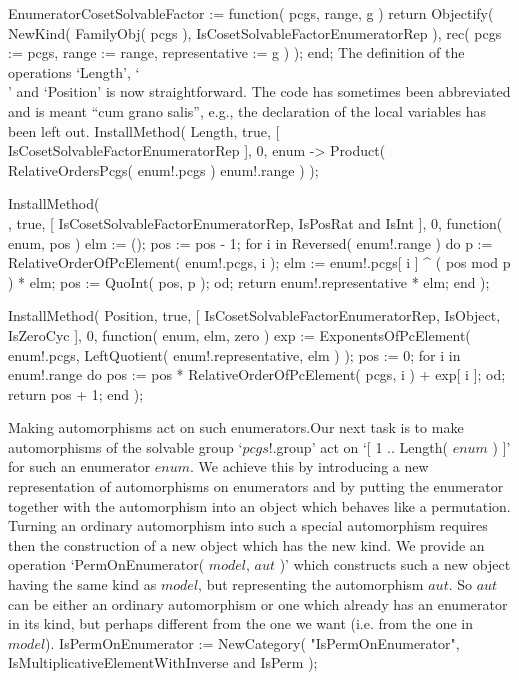 EnumeratorCosetSolvableFactor := function( pcgs, range, g )
    return Objectify( NewKind( FamilyObj( pcgs ),
                   IsCosetSolvableFactorEnumeratorRep ),
                   rec( pcgs := pcgs,
                       range := range,
              representative := g ) );
end;
\endtt
The definition of the operations `Length', `\\[\\]' and `Position' is now
straightforward. The  code has sometimes  been  abbreviated and is  meant
``cum grano salis'',  e.g.,  the declaration of  the local  variables has
been left out.
\begintt
InstallMethod( Length, true, [ IsCosetSolvableFactorEnumeratorRep ], 0,
    enum -> Product( RelativeOrdersPcgs( enum!.pcgs ){ enum!.range } ) );
\endtt

\begintt
InstallMethod( \[\], true, [ IsCosetSolvableFactorEnumeratorRep,
        IsPosRat and IsInt ], 0,
    function( enum, pos )
    elm := ();
    pos := pos - 1;
    for i  in Reversed( enum!.range )  do
        p := RelativeOrderOfPcElement( enum!.pcgs, i );
        elm := enum!.pcgs[ i ] ^ ( pos mod p ) * elm;
        pos := QuoInt( pos, p );
    od;
    return enum!.representative * elm;
end );
\endtt

\begintt
InstallMethod( Position, true, [ IsCosetSolvableFactorEnumeratorRep,
        IsObject, IsZeroCyc ], 0,
    function( enum, elm, zero )
    exp := ExponentsOfPcElement( enum!.pcgs,
                   LeftQuotient( enum!.representative, elm ) );
    pos := 0;
    for i  in enum!.range  do
        pos := pos * RelativeOrderOfPcElement( pcgs, i ) + exp[ i ];
    od;
    return pos + 1;
end );
\endtt

{\bsf  Making automorphisms act  on such enumerators.}\quad Our next task
is to make automorphisms of the  solvable group `$pcgs$!.group' act on `[
1 .. Length( $enum$ )  ]' for such an  enumerator $enum$. We achieve this
by  introducing a new  representation of automorphisms on enumerators and
by putting the enumerator together  with the automorphism into an  object
which behaves like  a permutation. Turning  an ordinary automorphism into
such  a special  automorphism requires  then   the construction of  a new
object which has the new kind. We provide an operation `PermOnEnumerator(
$model$, $aut$ )' which constructs such a new object having the same kind
as  $model$,  but representing the  automorphism  $aut$. So $aut$  can be
either an ordinary automorphism or one which already has an enumerator in
its kind, but perhaps  different from the one  we want (i.e. from the one
in $model$).
\begintt
IsPermOnEnumerator := NewCategory( "IsPermOnEnumerator",
    IsMultiplicativeElementWithInverse and IsPerm );
\endtt

